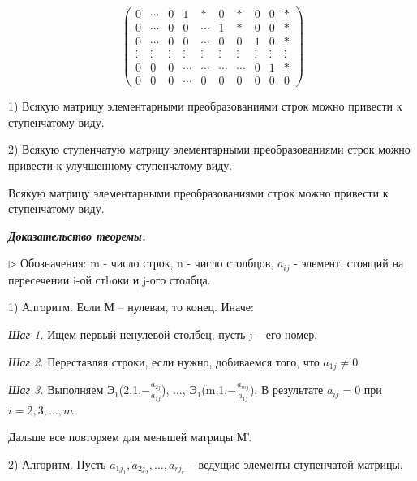 \[
	\begin{pmatrix}
    	0 & \cdots & 0 & 1 & * & 0 & * & 0 & 0 & * \\
        0 & \cdots & 0 & 0 & \cdots & 1 & * & 0 & 0 & * \\
        0 & \cdots & 0 & 0 & \cdots & 0 & 0 & 1 & 0 & * \\
        \vdots & \vdots & \vdots& \vdots & \vdots & \vdots & \vdots & \vdots & \vdots& \vdots \\
        0 & 0 & 0 & \cdots & \cdots & \cdots & \cdots & 0 & 1 & *\\
        0 & 0 & 0 & \cdots & 0 & 0 & 0 & 0 & 0 & 0
	\end{pmatrix}
\]

\begin{theorem}[]\label{theorem1}
	1) Всякую матрицу элементарными преобразованиями строк можно привести к ступенчатому виду.

2) Всякую ступенчатую матрицу элементарными преобразованиями строк можно привести к улучшенному ступенчатому виду.
\end{theorem}

\begin{corollary}
	Всякую матрицу элементарными преобразованиями строк можно привести к ступенчатому виду.
\end{corollary}

\begin{comment}
	Улучшенный ступенчатый вид матрицы определен однозначно.
\end{comment}

\textbf{\textit{Доказательство теоремы.}} 

$\rhd$ Обозначения: m - число строк, n - число столбцов, $a_{ij}$ - элемент, стоящий на пересечении i-ой стhоки и j-ого столбца.

\vspace{\baselineskip}
1) Алгоритм. Если М -- нулевая, то конец. Иначе:

\textit{Шаг 1.} Ищем первый ненулевой столбец, пусть j -- его номер.

\textit{Шаг 2.} Переставляя строки, если нужно, добиваемся того, что $a_{1j} \neq 0 $

\textit{Шаг 3.} Выполняем $Э_1$(2,1,$-\frac{a_{2j}}{a_{1j}}$), $\dots$, $Э_1$(m,1,$-\frac{a_{mj}}{a_{1j}}$). В результате $a_{ij} = 0$ при $i = 2,3, \dots, m$. 

Дальше все повторяем для меньшей матрицы М'.

\vspace{\baselineskip}
2) Алгоритм. Пусть $a_{1j_1}, a_{2j_2}, \dots, a_{rj_r}$ -- ведущие элементы ступенчатой матрицы.

